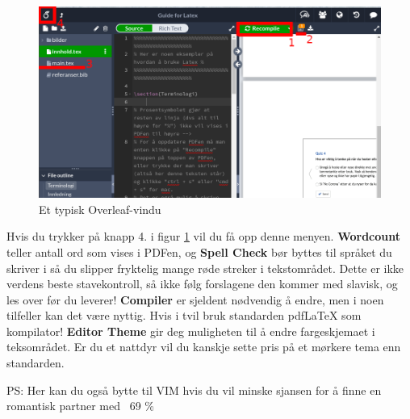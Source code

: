         
    \begin{figure}[h!]
        \centering
        \includegraphics[width=\textwidth]{bilder/overleaf-1.png}
        \caption{Et typisk Overleaf-vindu}
        \label{fig:oversikt-overleaf}
    \end{figure}
    
    Hvis du trykker på knapp 4. i figur \ref{fig:oversikt-overleaf} vil du få opp denne menyen. \textbf{Wordcount} teller antall ord som vises i PDFen, og \textbf{Spell Check} bør byttes til språket du skriver i så du slipper fryktelig mange røde streker i tekstområdet. Dette er ikke verdens beste stavekontroll, så ikke følg forslagene den kommer med slavisk, og les over før du leverer!
    \textbf{Compiler} er sjeldent nødvendig å endre, men i noen tilfeller kan det være nyttig. Hvis i tvil bruk standarden pdfLaTeX som kompilator!
    \textbf{Editor Theme} gir deg muligheten til å endre fargeskjemaet i teksområdet. Er du et nattdyr vil du kanskje sette pris på et mørkere tema enn standarden.
    
    {\tiny PS: Her kan du også bytte til VIM hvis du vil minske sjansen for å finne en romantisk partner med ~69 \%}
    
